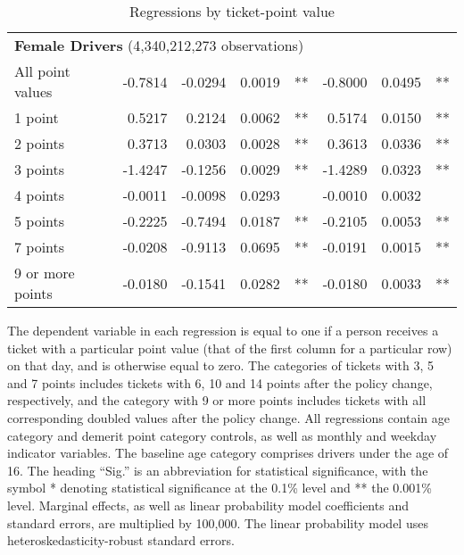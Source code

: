 \begin{table}
\begin{tabular}{l r r r l r r l}
\hline 

\multicolumn{7}{l}{\textbf{Female Drivers} (4,340,212,273 observations)} \\ 

All point values                &  -0.7814       &  -0.0294        &  0.0019       &   **       &  -0.8000        &  0.0495       &   **       \\ 
1 point                         &  0.5217       &  0.2124        &  0.0062       &   **       &  0.5174        &  0.0150       &   **       \\ 
2 points                        &  0.3713       &  0.0303        &  0.0028       &   **       &  0.3613        &  0.0336       &   **       \\ 
3 points                        &  -1.4247       &  -0.1256        &  0.0029       &   **       &  -1.4289        &  0.0323       &   **       \\ 
4 points                        &  -0.0011       &  -0.0098        &  0.0293       &            &  -0.0010        &  0.0032       &            \\ 
5 points                        &  -0.2225       &  -0.7494        &  0.0187       &   **       &  -0.2105        &  0.0053       &   **       \\ 
7 points                        &  -0.0208       &  -0.9113        &  0.0695       &   **       &  -0.0191        &  0.0015       &   **       \\ 
9 or more points                &  -0.0180       &  -0.1541        &  0.0282       &   **       &  -0.0180        &  0.0033       &   **       \\ 

\hline 

\end{tabular} 
\caption{Regressions by ticket-point value} 
%
The dependent variable in each regression is 
equal to one if a person receives a ticket with a particular point value 
(that of the first column for a particular row) on that day,
and is otherwise equal to zero.
%
The categories of tickets with 3, 5 and 7 points includes tickets  
with 6, 10 and 14 points after the policy change, respectively,  
and the category with 9 or more points includes tickets  
with all corresponding doubled values after the policy change. 
All regressions contain age category and demerit point category controls, 
as well as monthly and weekday indicator variables. 
The baseline age category comprises drivers under the age of 16. 
The heading ``Sig.'' is an abbreviation for statistical significance, with 
the symbol * denoting statistical significance at the 0.1\% level 
and ** the 0.001\% level. 
% 
Marginal effects, as well as linear probability model coefficients and standard errors, are multiplied by 100,000. 
The linear probability model uses heteroskedasticity-robust standard errors. 
% 
\label{tab:seas_Logit_vs_LPMx100K_regs_by_points} 
\end{table} 
 
